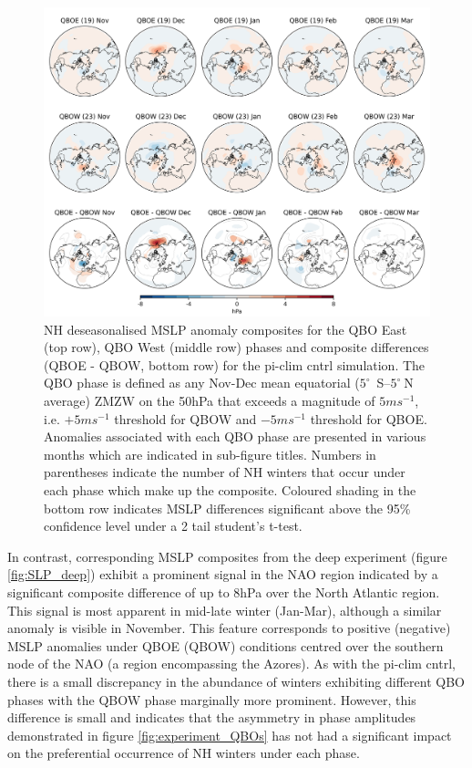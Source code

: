 \begin{figure}[h!]
\begin{center}
\noindent\includegraphics[width =0.8\linewidth]{Figures/Figures-deepQBO/LAGGED_SLP_composites_individual_months_QBO_phases_U_piclim_50hPa_5thresh.png}
\caption[MSLP composites under different QBO phases in the pi-clim cntrl simulation]{NH deseasonalised MSLP anomaly composites for the QBO East (top row), QBO West (middle row) phases and composite differences (QBOE - QBOW, bottom row) for the pi-clim cntrl simulation. The QBO phase is defined as any Nov-Dec mean equatorial ($5^{\circ}$\ S--$5^{\circ}\ $N average) ZMZW on the 50hPa that exceeds a magnitude of $5 ms^{-1}$, i.e. $+5 ms^{-1}$ threshold for QBOW and $-5 ms^{-1}$ threshold for QBOE. Anomalies associated with each QBO phase are presented in various months which are indicated in sub-figure titles. Numbers in parentheses indicate the number of NH winters that occur under each phase which make up the composite. Coloured shading in the bottom row indicates MSLP differences significant above the 95\% confidence level under a 2 tail student’s t-test.}
\label{fig:SLP_piclim}
\end{center}
\end{figure}

In contrast, corresponding MSLP composites from the deep experiment (figure \ref{fig:SLP_deep}) exhibit a prominent signal in the NAO region indicated by a significant composite difference of up to 8hPa over the North Atlantic region. This signal is most apparent in mid-late winter (Jan-Mar), although a similar anomaly is visible in November. This feature corresponds to positive (negative) MSLP anomalies under QBOE (QBOW) conditions centred over the southern node of the NAO (a region encompassing the Azores). As with the pi-clim cntrl, there is a small discrepancy in the abundance of winters exhibiting different QBO phases with the QBOW phase marginally more prominent. However, this difference is small and indicates that the asymmetry in phase amplitudes demonstrated in figure \ref{fig:experiment_QBOs} has not had a significant impact on the preferential occurrence of NH winters under each phase.

